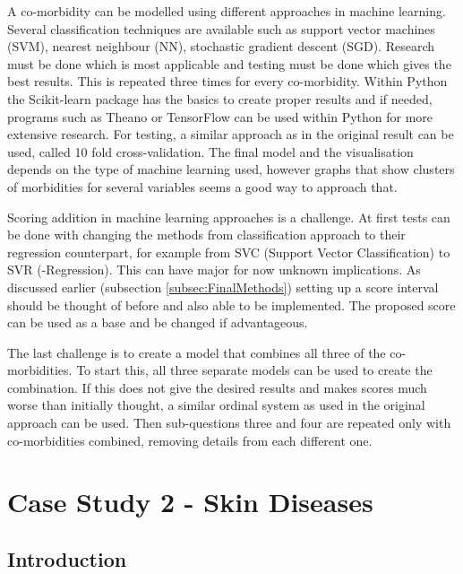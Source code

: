 \documentclass[10pt,a4paper]{report}
\begin{document}
	A co-morbidity can be modelled using different approaches in machine learning. Several classification techniques are available such as support vector machines (SVM), nearest neighbour (NN), stochastic gradient descent (SGD). Research must be done which is most applicable and testing must be done which gives the best results. This is repeated three times for every co-morbidity. Within Python the Scikit-learn package has the basics to create proper results and if needed, programs such as Theano or TensorFlow can be used within Python for more extensive research. For testing, a similar approach as in the original result can be used, called 10 fold cross-validation. The final model and the visualisation depends on the type of machine learning used, however graphs that show clusters of morbidities for several variables seems a good way to approach that.
	
	Scoring addition in machine learning approaches is a challenge. At first tests can be done with changing the methods from classification approach to their regression counterpart, for example from SVC (Support Vector Classification) to SVR (-Regression). This can have major for now unknown implications. As discussed earlier (subsection \ref{subsec:FinalMethods}) setting up a score interval should be thought of before and also able to be implemented. The proposed score can be used as a base and be changed if advantageous.
	
	The last challenge is to create a model that combines all three of the co-morbidities. To start this, all three separate models can be used to create the combination. If this does not give the desired results and makes scores much worse than initially thought, a similar ordinal system as used in the original approach can be used. Then sub-questions three and four are repeated only with co-morbidities combined, removing details from each different one.
	
	\chapter{Case Study 2 - Skin Diseases}
	\label{app:CS2}
	
	\section{Introduction}
	\label{sec:Introduction}
		
\end{document}
